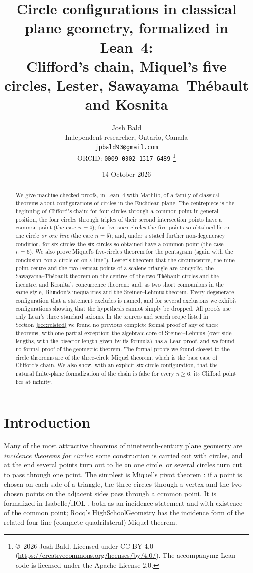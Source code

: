 \documentclass[11pt]{article}
\title{Circle configurations in classical plane geometry, formalized in Lean~4:\\
Clifford's chain, Miquel's five circles, Lester, Sawayama--Th\'ebault and Kosnita}
\author{Josh Bald\\ \small Independent researcher, Ontario, Canada\\ \small\texttt{jpbald93@gmail.com}\\
\small ORCID: \texttt{0009-0002-1317-6489}
\thanks{\copyright~2026 Josh Bald. Licensed under CC BY 4.0 (\url{https://creativecommons.org/licenses/by/4.0/}). The accompanying Lean code is licensed under the Apache License 2.0.}}
\date{14 October 2026}
\theoremstyle{definition}
\theoremstyle{remark}
\begin{document}
\sloppy
\maketitle

\begin{abstract}
We give machine-checked proofs, in Lean~4 with Mathlib, of a family of classical theorems about
configurations of circles in the Euclidean plane. The centrepiece is the beginning of Clifford's
chain: for four circles through a common point in general position, the four circles through
triples of their second intersection points have a common point (the case $n=4$); for five such
circles the five points so obtained lie on one circle \emph{or one line} (the case $n=5$); and, under
a stated further non-degeneracy condition, for six circles the six circles so obtained have a common
point (the case $n=6$). We also prove Miquel's five-circles theorem for the pentagram (again with
the conclusion ``on a circle or on a line''), Lester's theorem that the circumcentre, the
nine-point centre and the two Fermat points of a scalene triangle are concyclic, the
Sawayama--Th\'ebault theorem on the centres of the two Th\'ebault circles and the incentre, and
Kosnita's concurrence theorem; and, as two short companions in the same style, Blundon's
inequalities and the Steiner--Lehmus theorem. Every degenerate configuration that a statement
excludes is named, and for several exclusions we exhibit configurations showing that the hypothesis
cannot simply be dropped. All proofs use only Lean's three standard axioms.
In the sources and search scope listed in Section~\ref{sec:related} we found no previous complete formal
proof of any of these theorems, with one partial exception: the algebraic core of Steiner--Lehmus
(over side lengths, with the bisector length given by its formula) has a Lean proof, and we found no
formal proof of the geometric theorem. The formal proofs we found closest to the circle theorems are of
the three-circle Miquel theorem, which is the base case of Clifford's chain. We also show, with an
explicit six-circle configuration, that the natural finite-plane formalization of the chain is false
for every $n\ge6$: its Clifford point lies at infinity.
\end{abstract}

\section{Introduction}

Many of the most attractive theorems of nineteenth-century plane geometry are \emph{incidence
theorems for circles}: some construction is carried out with circles, and at the end several points
turn out to lie on one circle, or several circles turn out to pass through one point. The simplest is
Miquel's pivot theorem \cite{miquel1838}: if a point is chosen on each side of a triangle, the three
circles through a vertex and the two chosen points on the adjacent sides pass through a common
point. It is formalized in Isabelle/HOL \cite{afpmiquel}, both as an incidence statement and with
existence of the common point; Rocq's HighSchoolGeometry \cite{hsgeometry} has the incidence form of
the related four-line (complete quadrilateral) Miquel theorem.
\end{document}
